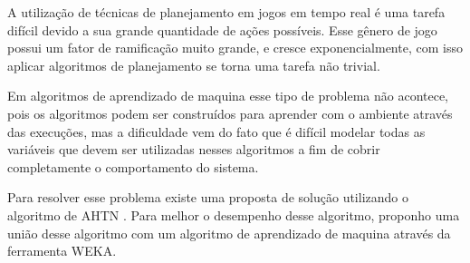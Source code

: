 A utilização de técnicas de planejamento em jogos em tempo real é uma tarefa difícil devido a sua grande quantidade de ações possíveis. 
Esse gênero de jogo possui um fator de ramificação muito grande, e cresce exponencialmente, com isso aplicar algoritmos de planejamento se torna uma tarefa não trivial. 


Em algoritmos de aprendizado de maquina esse tipo de problema não acontece, pois os algoritmos podem ser construídos para aprender com o ambiente através das execuções,  mas a dificuldade vem do fato que é difícil modelar todas as variáveis que devem ser utilizadas nesses algoritmos a fim de cobrir completamente o comportamento do sistema. 


Para resolver esse problema existe uma proposta de solução utilizando o algoritmo de AHTN \cite{ontanon2015adversarial}. Para melhor o desempenho desse algoritmo, proponho uma união desse algoritmo com um algoritmo de aprendizado de maquina através da ferramenta WEKA. 

